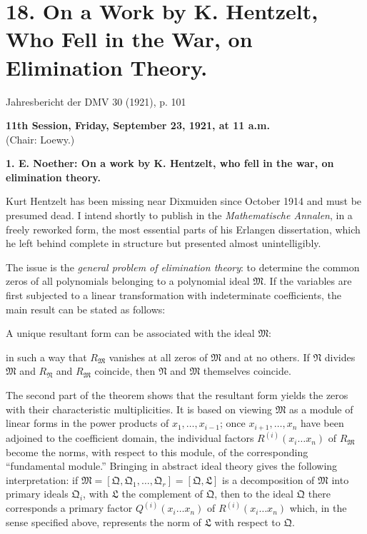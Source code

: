 \documentclass[11pt]{article}
\begin{document}
\section*{18. On a Work by K. Hentzelt, Who Fell in the War, on Elimination Theory.}

\begin{center}
Jahresbericht der DMV 30 (1921), p. 101
\end{center}

\begin{center}
\textbf{11th Session, Friday, September 23, 1921, at 11 a.m.}\\
(Chair: Loewy.)
\end{center}

\begin{center}
\textbf{1. E. Noether: On a work by K. Hentzelt, who fell in the war, on elimination theory.}
\end{center}

Kurt Hentzelt has been missing near Dixmuiden since October 1914 and must be presumed dead. I intend shortly to publish in the \emph{Mathematische Annalen}, in a freely reworked form, the most essential parts of his Erlangen dissertation, which he left behind complete in structure but presented almost unintelligibly.

The issue is the \emph{general problem of elimination theory}: to determine the common zeros of all polynomials belonging to a polynomial ideal $\mathfrak M$. If the variables are first subjected to a linear transformation with indeterminate coefficients, the main result can be stated as follows:

A unique resultant form can be associated with the ideal $\mathfrak M$:
\par\smallskip
\noindent{}
\par\smallskip\noindent
in such a way that $R_{\mathfrak M}$ vanishes at all zeros of $\mathfrak M$ and at no others. If $\mathfrak N$ divides $\mathfrak M$ and $R_{\mathfrak N}$ and $R_{\mathfrak M}$ coincide, then $\mathfrak N$ and $\mathfrak M$ themselves coincide.

The second part of the theorem shows that the resultant form yields the zeros with their characteristic multiplicities. It is based on viewing $\mathfrak M$ as a module of linear forms in the power products of $x_1,\ldots,x_{i-1}$; once $x_{i+1},\ldots,x_n$ have been adjoined to the coefficient domain, the individual factors $R^{(i)}(x_i\ldots x_n)$ of $R_{\mathfrak M}$ become the norms, with respect to this module, of the corresponding ``fundamental module.'' Bringing in abstract ideal theory gives the following interpretation: if $\mathfrak M=[\mathfrak Q,\mathfrak Q_1,\ldots,\mathfrak Q_r]=[\mathfrak Q,\mathfrak L]$ is a decomposition of $\mathfrak M$ into primary ideals $\mathfrak Q_i$, with $\mathfrak L$ the complement of $\mathfrak Q$, then to the ideal $\mathfrak Q$ there corresponds a primary factor $Q^{(i)}(x_i\ldots x_n)$ of $R^{(i)}(x_i\ldots x_n)$ which, in the sense specified above, represents the norm of $\mathfrak L$ with respect to $\mathfrak Q$.
\end{document}

